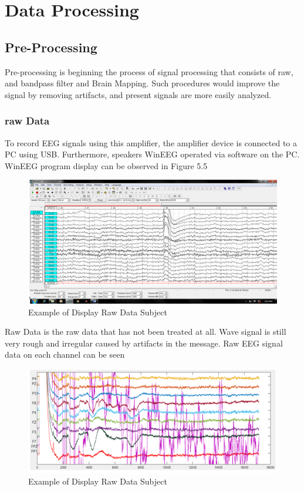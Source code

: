 \section{Data Processing}
\subsection{Pre-Processing}
\par
Pre-processing is beginning the process of signal processing that consists of raw, and bandpass filter and Brain Mapping. Such procedures would improve the signal by removing artifacts, and present signals are more easily analyzed.

\subsubsection{raw Data}
\par
To record EEG signals using this amplifier, the amplifier device is connected to a PC using USB. Furthermore, speakers WinEEG operated via software on the PC. WinEEG program display can be observed in Figure 5.5
\begin{figure}[h!]
\centering
\includegraphics[scale=0.6]{figures/52.PNG}
\caption{Example of Display Raw Data Subject}
\label{labelgambar9}
\end{figure}

\par
Raw Data is the raw data that has not been treated at all. Wave signal is still very rough and irregular caused by artifacts in the message. Raw EEG signal data on each channel can be seen
\begin{figure}[h!]
\centering
\includegraphics[scale=0.6]{figures/55.PNG}
\caption{Example of Display Raw Data Subject}
\label{labelgambar10}
\end{figure}

